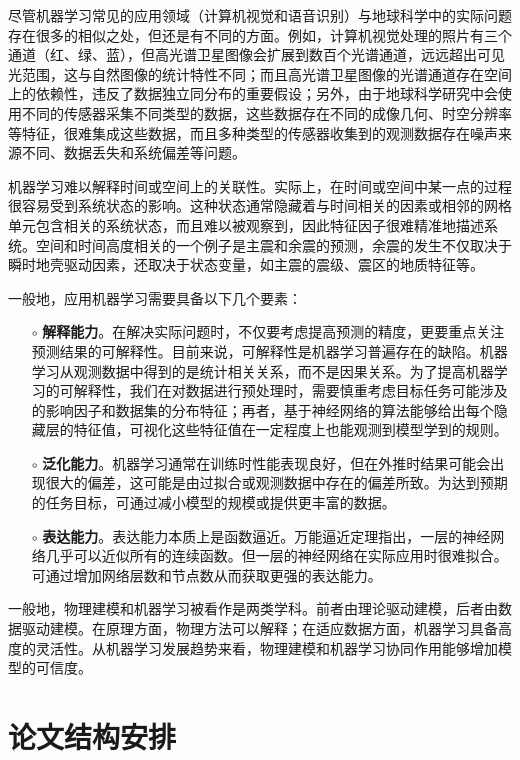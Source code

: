 尽管机器学习常见的应用领域（计算机视觉和语音识别）与地球科学中的实际问题存在很多的相似之处，但还是有不同的方面。例如，计算机视觉处理的照片有三个通道（红、绿、蓝），但高光谱卫星图像会扩展到数百个光谱通道，远远超出可见光范围，这与自然图像的统计特性不同；而且高光谱卫星图像的光谱通道存在空间上的依赖性，违反了数据独立同分布的重要假设；另外，由于地球科学研究中会使用不同的传感器采集不同类型的数据，这些数据存在不同的成像几何、时空分辨率等特征，很难集成这些数据，而且多种类型的传感器收集到的观测数据存在噪声来源不同、数据丢失和系统偏差等问题。

机器学习难以解释时间或空间上的关联性。实际上，在时间或空间中某一点的过程很容易受到系统状态的影响。这种状态通常隐藏着与时间相关的因素或相邻的网格单元包含相关的系统状态，而且难以被观察到，因此特征因子很难精准地描述系统。空间和时间高度相关的一个例子是主震和余震的预测，余震的发生不仅取决于瞬时地壳驱动因素，还取决于状态变量，如主震的震级、震区的地质特征等。

一般地，应用机器学习需要具备以下几个要素：
\begin{enumerate}
  \item[$\circ$] \textbf{解释能力}。在解决实际问题时，不仅要考虑提高预测的精度，更要重点关注预测结果的可解释性。目前来说，可解释性是机器学习普遍存在的缺陷\citep{montavon2018methods}。机器学习从观测数据中得到的是统计相关关系，而不是因果关系\citep{runge2015identifying,reichstein2019deep}。为了提高机器学习的可解释性，我们在对数据进行预处理时，需要慎重考虑目标任务可能涉及的影响因子和数据集的分布特征；再者，基于神经网络的算法能够给出每个隐藏层的特征值，可视化这些特征值在一定程度上也能观测到模型学到的规则。
  \item[$\circ$] \textbf{泛化能力}。机器学习通常在训练时性能表现良好，但在外推时结果可能会出现很大的偏差，这可能是由过拟合或观测数据中存在的偏差所致\citep{friedlingstein2014uncertainties}。为达到预期的任务目标，可通过减小模型的规模或提供更丰富的数据。
  \item[$\circ$] \textbf{表达能力}。表达能力本质上是函数逼近。万能逼近定理指出，一层的神经网络几乎可以近似所有的连续函数。但一层的神经网络在实际应用时很难拟合。可通过增加网络层数和节点数从而获取更强的表达能力。
\end{enumerate}

一般地，物理建模和机器学习被看作是两类学科。前者由理论驱动建模，后者由数据驱动建模。在原理方面，物理方法可以解释；在适应数据方面，机器学习具备高度的灵活性。从机器学习发展趋势来看，物理建模和机器学习协同作用能够增加模型的可信度\citep{karpatne2017theory,karpatne2017physics,camps2018physics}。

\section{论文结构安排}\label{sec:intro_strcture}

